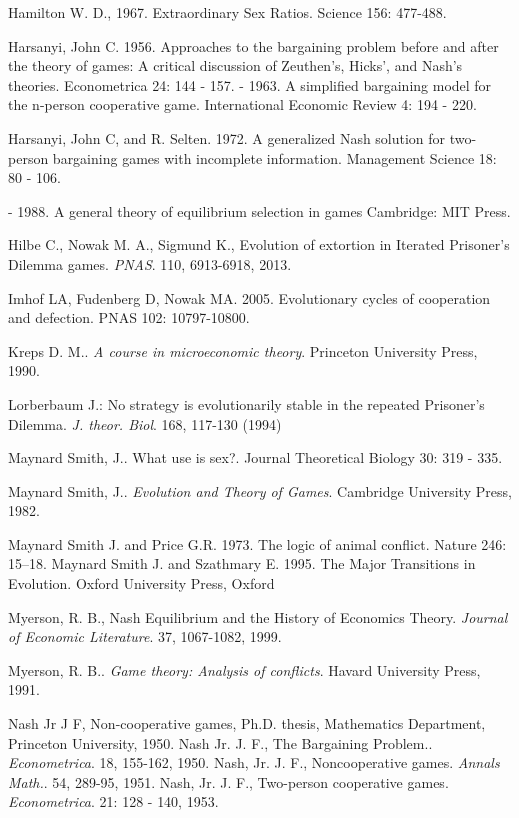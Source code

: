 \documentclass[12.5pt]{report}
\begin{document}
\begin{thebibliography}{}
 Hamilton W. D., 1967. Extraordinary Sex Ratios. Science 156: 477-488.

 Harsanyi, John C. 1956. Approaches to the bargaining problem before and after the theory of games: A critical discussion of Zeuthen’s, Hicks’, and Nash’s theories. Econometrica 24: 144 - 157.
 - 1963. A simplified bargaining model for the n-person cooperative game. International Economic Review 4: 194 - 220.

 Harsanyi, John C, and R. Selten. 1972. A generalized Nash solution for two-person bargaining games with incomplete information. Management Science 18: 80 - 106.

 - 1988. A general theory of equilibrium selection in games Cambridge: MIT Press.

 Hilbe C., Nowak M. A., Sigmund K., Evolution of extortion in Iterated Prisoner's Dilemma games. {\emph{PNAS}}. 110, 6913-6918, 2013.

 Imhof LA, Fudenberg D, Nowak MA. 2005. Evolutionary cycles of cooperation and defection. PNAS 102: 10797-10800.

 Kreps D. M.. {\emph{A course in microeconomic theory}}. Princeton University Press, 1990. 

 Lorberbaum J.: No strategy is evolutionarily stable in the repeated Prisoner's Dilemma. \emph{J. theor. Biol}. 168, 117-130 (1994)

 Maynard Smith, J.. What use is sex?. Journal Theoretical Biology 30: 319 - 335.

 Maynard Smith, J.. {\emph{Evolution and Theory of Games}}. Cambridge University Press, 1982. 

 Maynard Smith J. and Price G.R. 1973. The logic of animal conflict. Nature 246: 15–18. Maynard Smith J. and Szathmary E. 1995. The Major Transitions in Evolution. Oxford University Press, Oxford

 Myerson, R. B., Nash Equilibrium and the History of Economics Theory. {\emph{Journal of Economic Literature}}. 37, 1067-1082, 1999. 

 Myerson, R. B.. {\emph{Game theory: Analysis of conflicts}}. Havard University Press, 1991. 

 Nash Jr J F, Non-cooperative games, Ph.D. thesis, Mathematics Department, Princeton University, 1950.
 Nash Jr. J. F., The Bargaining Problem.. {\emph{Econometrica}}. 18, 155-162, 1950. 
 Nash, Jr. J. F., Noncooperative games. {\emph{Annals Math.}}. 54, 289-95, 1951. 
 Nash, Jr. J. F., Two-person cooperative games. {\emph{Econometrica}}. 21: 128 - 140, 1953.


\end{thebibliography}
\end{document}
